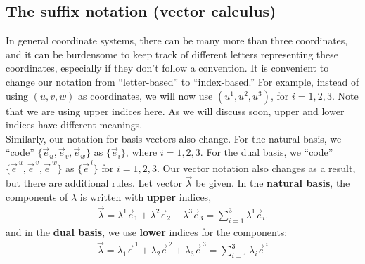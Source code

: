 \documentclass{book}
\theoremstyle{definition}
\begin{document}
\subsection{The suffix notation (vector calculus)}
In general coordinate systems, there can be many more than three coordinates, and it can be burdensome to keep track of different letters representing these coordinates, especially if they don't follow a convention. It is convenient to change our notation from ``letter-based'' to ``index-based.'' For example, instead of using $(u,v,w)$ as coordinates, we will now use $(u^1,u^2,u^3)$, for $i=1,2,3$. Note that we are using upper indices here. As we will discuss soon, upper and lower indices have different meanings. \\

Similarly, our notation for basis vectors also change. For the natural basis, we ``code'' $\{ \vec{e}_u, \vec{e}_v, \vec{e}_w \}$ as $\{\vec{e}_i \}$, where $i=1,2,3$. For the dual basis, we ``code'' $\{ \vec{e}^{\,u},\vec{e}^{\,v},\vec{e}^{\,w} \}$ as $\{ \vec{e}^{\,i} \}$ for $i=1,2,3$. Our vector notation also changes as a result, but there are additional rules. Let vector $\vec{\lambda}$ be given. In the \textbf{natural basis}, the components of $\lambda$ is written with \textbf{upper} indices,
\begin{align*}
\vec{\lambda} = \lambda^1\vec{e}_1 + \lambda^2\vec{e}_2 + \lambda^3\vec{e}_3 = \sum_{i=1}^{3}\lambda^1\vec{e}_i.
\end{align*} 
and in the \textbf{dual basis}, we use \textbf{lower} indices for the components:
\begin{align*}
\vec{\lambda} = \lambda_1\vec{e}^{\,1} + \lambda_2\vec{e}^{\,2} + \lambda_3\vec{e}^{\,3} = \sum_{i=1}^{3}\lambda_i\vec{e}^{\,i}
\end{align*}
\end{document}
